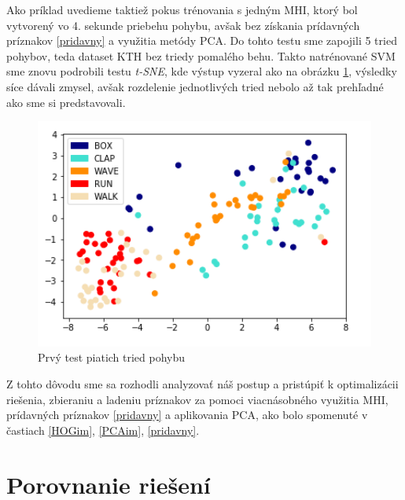 Ako príklad uvedieme taktiež pokus trénovania s jedným MHI, ktorý bol vytvorený vo 4. sekunde priebehu pohybu, avšak bez získania prídavných príznakov \ref{pridavny} a využitia metódy PCA.  Do tohto testu sme zapojili 5 tried pohybov, teda dataset KTH bez triedy pomalého behu. Takto natrénované SVM sme znovu podrobili testu \textit{t-SNE}, kde výstup vyzeral ako na obrázku \ref{Test5Class1}, výsledky síce dávali zmysel, avšak rozdelenie jednotlivých tried nebolo až tak prehľadné ako sme si predstavovali.

\begin{figure}[H]
  \centering
  \includegraphics[width=16cm]{img/test5classes1.png}
  \caption{Prvý test piatich tried pohybu}
  \label{Test5Class1}
\end{figure}

Z tohto dôvodu sme sa rozhodli analyzovať náš postup a pristúpiť k optimalizácii riešenia, zbieraniu a ladeniu príznakov za pomoci viacnásobného využitia MHI, prídavných príznakov \ref{pridavny} a aplikovania PCA, ako bolo spomenuté v častiach \ref{HOGim}, \ref{PCAim}, \ref{pridavny}.

\section{Porovnanie riešení}



